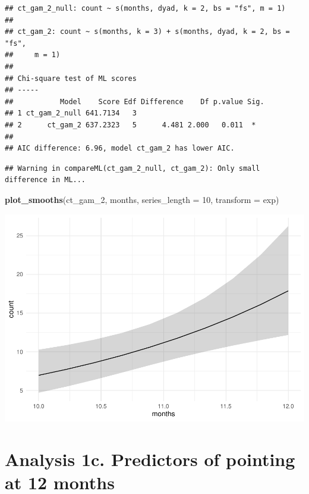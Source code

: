 \documentclass[]{article}
\newenvironment{Shaded}{\begin{snugshade}}{\end{snugshade}}
\newcommand{\DataTypeTok}[1]{\textcolor[rgb]{0.13,0.29,0.53}{#1}}
\newcommand{\DecValTok}[1]{\textcolor[rgb]{0.00,0.00,0.81}{#1}}
\newcommand{\KeywordTok}[1]{\textcolor[rgb]{0.13,0.29,0.53}{\textbf{#1}}}
\newcommand{\NormalTok}[1]{#1}
\begin{document}
\begin{verbatim}
## ct_gam_2_null: count ~ s(months, dyad, k = 2, bs = "fs", m = 1)
## 
## ct_gam_2: count ~ s(months, k = 3) + s(months, dyad, k = 2, bs = "fs", 
##     m = 1)
## 
## Chi-square test of ML scores
## -----
##           Model    Score Edf Difference    Df p.value Sig.
## 1 ct_gam_2_null 641.7134   3                              
## 2      ct_gam_2 637.2323   5      4.481 2.000   0.011  *  
## 
## AIC difference: 6.96, model ct_gam_2 has lower AIC.
\end{verbatim}

\begin{verbatim}
## Warning in compareML(ct_gam_2_null, ct_gam_2): Only small difference in ML...
\end{verbatim}

\begin{Shaded}
\begin{Highlighting}[]
\KeywordTok{plot_smooths}\NormalTok{(ct_gam_}\DecValTok{2}\NormalTok{, months, }\DataTypeTok{series_length =} \DecValTok{10}\NormalTok{, }\DataTypeTok{transform =}\NormalTok{ exp)}
\end{Highlighting}
\end{Shaded}

\includegraphics{supplement_files/figure-latex/ct-gam-2-plot-1.pdf}

\newpage

\hypertarget{analysis-1c.-predictors-of-pointing-at-12-months}{%
\section{Analysis 1c. Predictors of pointing at 12
months}\label{analysis-1c.-predictors-of-pointing-at-12-months}}
\end{document}
